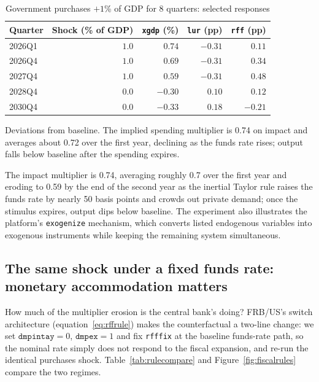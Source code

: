 \begin{table}[htbp]
\centering
\caption{Government purchases $+1$\% of GDP for 8 quarters: selected responses}
\label{tab:fiscal}
\begin{tabular}{lrrrr}
\toprule
Quarter & Shock (\% of GDP) & \texttt{xgdp} (\%) & \texttt{lur} (pp) & \texttt{rff} (pp) \\
\midrule
2026Q1 & $1.0$ & $0.74$ & $-0.31$ & $0.11$ \\
2026Q4 & $1.0$ & $0.69$ & $-0.31$ & $0.34$ \\
2027Q4 & $1.0$ & $0.59$ & $-0.31$ & $0.48$ \\
2028Q4 & $0.0$ & $-0.30$ & $0.10$ & $0.12$ \\
2030Q4 & $0.0$ & $-0.33$ & $0.18$ & $-0.21$ \\
\bottomrule
\end{tabular}

\medskip
\parbox{0.92\textwidth}{\footnotesize Deviations from baseline. The implied spending multiplier is 0.74 on impact and averages about 0.72 over the first year, declining as the funds rate rises; output falls below baseline after the spending expires.}
\end{table}

The impact multiplier is 0.74, averaging roughly 0.7 over the first year and eroding to 0.59 by the end of the second year as the inertial Taylor rule raises the funds rate by nearly 50 basis points and crowds out private demand; once the stimulus expires, output dips below baseline. The experiment also illustrates the platform's \texttt{exogenize} mechanism, which converts listed endogenous variables into exogenous instruments while keeping the remaining system simultaneous.

\subsection{The same shock under a fixed funds rate: monetary accommodation matters}
\label{sec:rulecomp}

How much of the multiplier erosion is the central bank's doing? FRB/US's switch architecture (equation~\ref{eq:rffrule}) makes the counterfactual a two-line change: we set $\texttt{dmpintay}=0$, $\texttt{dmpex}=1$ and fix \texttt{rfffix} at the baseline funds-rate path, so the nominal rate simply does not respond to the fiscal expansion, and re-run the identical purchases shock. Table~\ref{tab:rulecompare} and Figure~\ref{fig:fiscalrules} compare the two regimes.


